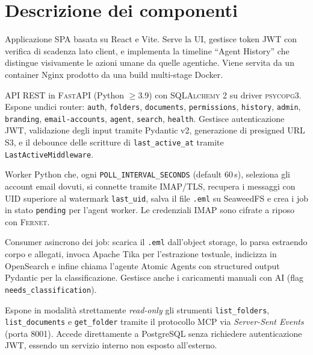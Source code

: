 \section{Descrizione dei componenti}
\label{sec:componenti}

\begin{description}[leftmargin=*]
    \item[Frontend (\texttt{frontend/})] Applicazione \textsc{SPA} basata su React e Vite.
          Serve la UI, gestisce token JWT con verifica di scadenza lato client, e implementa
          la timeline ``Agent History'' che distingue visivamente le azioni umane da quelle
          agentiche. Viene servita da un container Nginx prodotto da una build multi-stage Docker.

    \item[Backend (\texttt{backend/})] API REST in \textsc{FastAPI} (Python $\geq$3.9) con
          \textsc{SQLAlchemy 2} su driver \textsc{psycopg3}. Espone undici router:
          \texttt{auth}, \texttt{folders}, \texttt{documents}, \texttt{permissions},
          \texttt{history}, \texttt{admin}, \texttt{branding}, \texttt{email-accounts},
          \texttt{agent}, \texttt{search}, \texttt{health}. Gestisce autenticazione JWT,
          validazione degli input tramite Pydantic v2, generazione di presigned URL S3,
          e il debounce delle scritture di \texttt{last\_active\_at} tramite
          \texttt{LastActiveMiddleware}.

    \item[Email Poller (\texttt{email\_poller/})] Worker Python che, ogni
          \texttt{POLL\_INTERVAL\_SECONDS} (default 60\,s), seleziona gli account email
          dovuti, si connette tramite IMAP/TLS, recupera i messaggi con UID superiore al
          watermark \texttt{last\_uid}, salva il file \texttt{.eml} su SeaweedFS e crea
          i job in stato \texttt{pending} per l'agent worker. Le credenziali IMAP sono
          cifrate a riposo con \textsc{Fernet}.

    \item[Agent Worker (\texttt{agent\_worker/})] Consumer asincrono dei job: scarica il
          \texttt{.eml} dall'object storage, lo parsa estraendo corpo e allegati, invoca
          Apache Tika per l'estrazione testuale, indicizza in OpenSearch e infine chiama
          l'agente Atomic Agents con structured output Pydantic per la classificazione.
          Gestisce anche i caricamenti manuali con AI (flag \texttt{needs\_classification}).

    \item[MCP Server (\texttt{mcp\_server/})] Espone in modalit\`a strettamente
          \emph{read-only} gli strumenti \texttt{list\_folders}, \texttt{list\_documents}
          e \texttt{get\_folder} tramite il protocollo MCP via \emph{Server-Sent Events}
          (porta 8001). Accede direttamente a PostgreSQL senza richiedere autenticazione
          JWT, essendo un servizio interno non esposto all'esterno.


\end{description}
